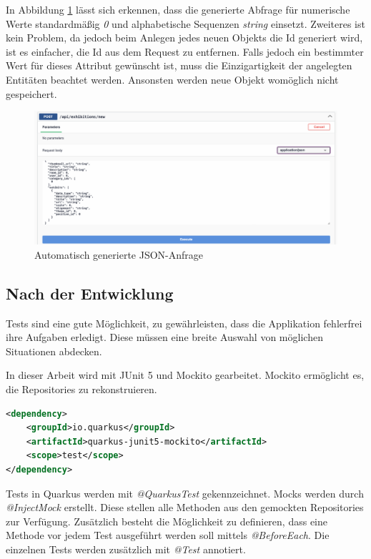 In Abbildung \ref{fig:implementation:swaggeruipost} lässt sich erkennen, dass die generierte Abfrage für numerische Werte standardmäßig \emph{0} und alphabetische Sequenzen \emph{string} einsetzt. 
Zweiteres ist kein Problem, da jedoch beim Anlegen jedes neuen Objekts die Id generiert wird, ist es einfacher, die Id aus dem Request zu entfernen. 
Falls jedoch ein bestimmter Wert für dieses Attribut gewünscht ist, muss die Einzigartigkeit der angelegten Entitäten beachtet werden. 
Ansonsten werden neue Objekt womöglich nicht gespeichert.

\begin{figure}
    \centering
    \includegraphics[scale=0.3]{pics/swaggeruipost.png}
    \caption{Automatisch generierte JSON-Anfrage}
    \label{fig:implementation:swaggeruipost}
\end{figure}

\subsection{Nach der Entwicklung}
Tests sind eine gute Möglichkeit, zu gewährleisten, dass die Applikation fehlerfrei ihre Aufgaben erledigt. 
Diese müssen eine breite Auswahl von möglichen Situationen abdecken.

In dieser Arbeit wird mit JUnit 5 und Mockito gearbeitet. 
Mockito ermöglicht es, die Repositories zu rekonstruieren. 
\cite{quarkusMockAbout}
\begin{lstlisting}[label=JUnit 5 Abhängigkeit in pom.xml, language=xml]
<dependency>
    <groupId>io.quarkus</groupId>
    <artifactId>quarkus-junit5-mockito</artifactId>
    <scope>test</scope>
</dependency>
\end{lstlisting}

Tests in Quarkus werden mit \emph{@QuarkusTest} gekennzeichnet. 
Mocks werden durch \emph{@InjectMock} erstellt.
Diese stellen alle Methoden aus den gemockten Repositories zur Verfügung.
Zusätzlich besteht die Möglichkeit zu definieren, dass eine Methode vor jedem Test ausgeführt werden soll mittels \emph{@BeforeEach}. 
Die einzelnen Tests werden zusätzlich mit \emph{@Test} annotiert. 
\cite{quarkusMockAbout}

